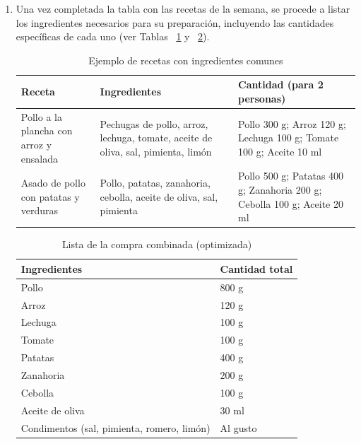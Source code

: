 \documentclass[twoside, openright, 11pt]{report}
\begin{document}
\begin{enumerate}
			\item Una vez completada la tabla con las recetas de la semana, se procede a listar los ingredientes necesarios para su preparación, incluyendo las cantidades específicas de cada uno (ver Tablas ~\ref{fig:TablaDeIngredientes} y ~\ref{fig:TablaCombinada}).
			
			\begin{table}[H]
				\centering
				\caption{Ejemplo de recetas con ingredientes comunes}
				\begin{tabular}{|p{3.5cm}|p{7cm}|p{3cm}|}
					\hline
					\textbf{Receta} & \textbf{Ingredientes} & \textbf{Cantidad (para 2 personas)} \\ \hline
					Pollo a la plancha con arroz y ensalada &
					Pechugas de pollo, arroz, lechuga, tomate, aceite de oliva, sal, pimienta, limón &
					Pollo 300 g; Arroz 120 g; Lechuga 100 g; Tomate 100 g; Aceite 10 ml \\ \hline
					
					Asado de pollo con patatas y verduras &
					Pollo, patatas, zanahoria, cebolla, aceite de oliva, sal, pimienta &
					Pollo 500 g; Patatas 400 g; Zanahoria 200 g; Cebolla 100 g; Aceite 20 ml \\ \hline
				\end{tabular}
				\label{fig:TablaDeIngredientes}
			\end{table}
			\begin{table}[H]
				\centering
				\caption{Lista de la compra combinada (optimizada)}
				
				\begin{tabular}{|p{5cm}|p{3cm}|}
					\hline
					\textbf{Ingredientes} & \textbf{Cantidad total} \\ \hline
					Pollo & 800 g \\ \hline
					Arroz & 120 g \\ \hline
					Lechuga & 100 g \\ \hline
					Tomate & 100 g \\ \hline
					Patatas & 400 g \\ \hline
					Zanahoria & 200 g \\ \hline
					Cebolla & 100 g \\ \hline
					Aceite de oliva & 30 ml \\ \hline
					Condimentos (sal, pimienta, romero, limón) & Al gusto \\ \hline
				\end{tabular}
			\label{fig:TablaCombinada}
			\end{table}
			

\end{enumerate}
\end{document}
